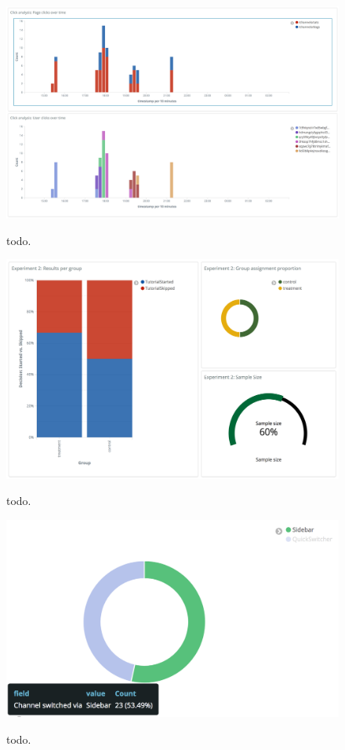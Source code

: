 \begin{figure}[htb]
        \caption{todo.}
        \includegraphics[width=1.1\textwidth]{gfx/dashboard-clicks-zoom.png}
        \label{figure:evaluation:user:dashboard-clicks-zoom-user}
\end{figure}

\begin{figure}[htb]
        \caption{todo.}
        \includegraphics[width=1.1\textwidth]{gfx/dashboard-ab-test.png}
        \label{figure:evaluation:user:dashboard-ab-test}
\end{figure}

\begin{figure}[htb]
        \caption{todo.}
        \includegraphics[width=1.1\textwidth]{gfx/visualization-feature-analysis.png}
        \label{figure:evaluation:user:visualization-feature-analysis}
\end{figure}

